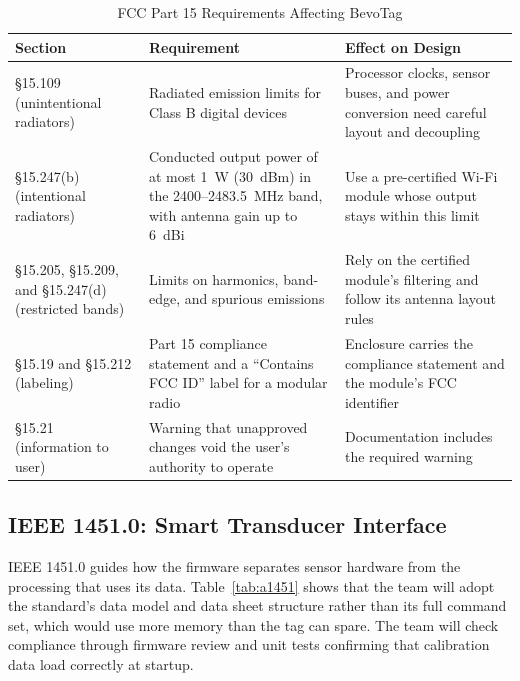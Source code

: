 \documentclass[12pt,letterpaper]{article}
\newenvironment{spectable}{\setstretch{1.0}\renewcommand{\arraystretch}{1.1}}{}
\begin{document}
\begin{table}[H]
\caption{FCC Part 15 Requirements Affecting BevoTag}
\label{tab:afcc}
\centering
\begin{spectable}
\begin{tabularx}{\linewidth}{@{}L{1.7in} Y Y@{}}
\toprule
\textbf{Section} & \textbf{Requirement} & \textbf{Effect on Design} \\
\midrule
\S15.109 (unintentional radiators) & Radiated emission limits for Class B digital devices & Processor clocks, sensor buses, and power conversion need careful layout and decoupling \\
\S15.247(b) (intentional radiators) & Conducted output power of at most 1~W (30~dBm) in the 2400--2483.5~MHz band, with antenna gain up to 6~dBi & Use a pre-certified Wi-Fi module whose output stays within this limit \\
\S15.205, \S15.209, and \S15.247(d) (restricted bands) & Limits on harmonics, band-edge, and spurious emissions & Rely on the certified module's filtering and follow its antenna layout rules \\
\S15.19 and \S15.212 (labeling) & Part 15 compliance statement and a ``Contains FCC ID'' label for a modular radio & Enclosure carries the compliance statement and the module's FCC identifier \\
\S15.21 (information to user) & Warning that unapproved changes void the user's authority to operate & Documentation includes the required warning \\
\bottomrule
\end{tabularx}
\end{spectable}
\end{table}

\subsection*{IEEE 1451.0: Smart Transducer Interface}
IEEE 1451.0 \cite{std1451} guides how the firmware separates sensor hardware from the processing that
uses its data. Table~\ref{tab:a1451} shows that the team will adopt the standard's data model and
data sheet structure rather than its full command set, which would use more memory than the tag can
spare. The team will check compliance through firmware review and unit tests confirming that
calibration data load correctly at startup.
\end{document}

